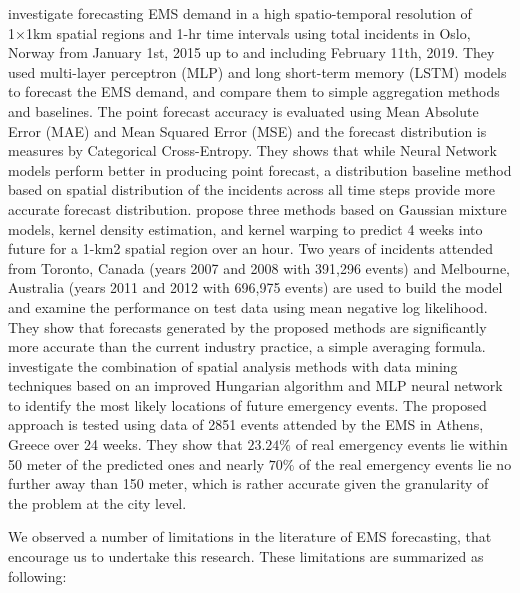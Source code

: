 \documentclass[
  authoryear,
  preprint,
  3p]{elsarticle}
\begin{document}
\citet{9659837} investigate forecasting EMS demand in a high
spatio-temporal resolution of 1×1km spatial regions and 1-hr time
intervals using total incidents in Oslo, Norway from January 1st, 2015
up to and including February 11th, 2019. They used multi-layer
perceptron (MLP) and long short-term memory (LSTM) models to forecast
the EMS demand, and compare them to simple aggregation methods and
baselines. The point forecast accuracy is evaluated using Mean Absolute
Error (MAE) and Mean Squared Error (MSE) and the forecast distribution
is measures by Categorical Cross-Entropy. They shows that while Neural
Network models perform better in producing point forecast, a
distribution baseline method based on spatial distribution of the
incidents across all time steps provide more accurate forecast
distribution. \citet{zhou2016predictinglit} propose three methods based
on Gaussian mixture models, kernel density estimation, and kernel
warping to predict 4 weeks into future for a 1-km2 spatial region over
an hour. Two years of incidents attended from Toronto, Canada (years
2007 and 2008 with 391,296 events) and Melbourne, Australia (years 2011
and 2012 with 696,975 events) are used to build the model and examine
the performance on test data using mean negative log likelihood. They
show that forecasts generated by the proposed methods are significantly
more accurate than the current industry practice, a simple averaging
formula. \citet{grekousis2019will} investigate the combination of
spatial analysis methods with data mining techniques based on an
improved Hungarian algorithm and MLP neural network to identify the most
likely locations of future emergency events. The proposed approach is
tested using data of 2851 events attended by the EMS in Athens, Greece
over 24 weeks. They show that \(23.24\%\) of real emergency events lie
within 50 meter of the predicted ones and nearly \(70\%\) of the real
emergency events lie no further away than 150 meter, which is rather
accurate given the granularity of the problem at the city level.

We observed a number of limitations in the literature of EMS
forecasting, that encourage us to undertake this research. These
limitations are summarized as following:
\end{document}
